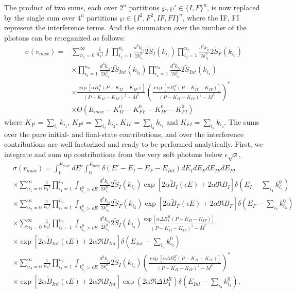 The product of two sums, each over $2^n$ partitions $\wp,\wp'\in\{I,F\}^n$, is now replaced by the single sum over $4^n$ partitions $\wp\in\{I^2,F^2,IF,FI\}^n$, where the IF, FI represent the interference terms. And the summation over the number of the photons can be reorganized as follows:
\begin{align}
\sigma(v_{max})
=&\sum_{n_1=0}^{\infty}\frac{1}{n_1!}\int\prod_{i_1=1}^{n_1}\frac{d^3k_{i_1}}{2k^0_{i_1}}2\widetilde{S}_I(k_{i_1})\prod_{i_2=1}^{n_2}\frac{d^3k_{i_2}}{2k^0_{i_2}}2\widetilde{S}_F(k_{i_2})\nonumber\\
&\times\prod_{i_3=1}^{n_3}\frac{d^3k_{i_3}}{2k^0_{i_3}}2\widetilde{S}_{Int}(k_{i_3})\prod_{i_4=1}^{n_4}\frac{d^3k_{i_4}}{2k^0_{i_4}}2\widetilde{S}_{Int}(k_{i_4})\nonumber\\
&\times\frac{\exp[\alpha B^R_4(P-K_{II}-K_{IF})]}{(P-K_{II}-K_{IF})^2-\bar{M}^2}\left(\frac{\exp[\alpha B^R_4(P-K_{II}-K_{IF})]}{(P-K_{II}-K_{IF})^2-\bar{M}^2}\right)^\ast\nonumber\\
&\times\Theta(E_{max}-K^0_{II}-K^0_{FF}-K^0_{IF}-K^0_{FI})
\end{align}
where $K_{I^2}=\sum_{i_1}k_{i_1}$, $K_{F^2}=\sum_{i_2}k_{i_2}$, $K_{IF}=\sum_{i_3}k_{i_3}$ and $K_{FI}=\sum_{i_4}k_{i_4}$. The sums over the pure initial- and final-state contributions, and over the interference contributions are well factorized and ready to be performed analytically. First, we integrate and sum up contributions from the very soft photons below $\epsilon\sqrt{s}$,
\begin{align}
&\sigma(v_{max})=\int_{0}^{E_{max}}dE'\int_{0}^{E_{max}}\delta(E'-E_I-E_F-E_{Int})dE_IdE_FdE_{IF}dE_{FI}\nonumber\\
&\times\sum_{n_1=0}^{\infty}\frac{1}{n_1!}\prod_{i_1=1}^{n_1}\int_{k^0_{i_1}>\epsilon E}\frac{d^3k_{i_1}}{2k^0_{i_1}}2\widetilde{S}_I(k_{i_1})\exp[2\alpha\widetilde{B}_I(\epsilon E)+2\alpha\Re B_I]\delta\left(E_I-\sum_{i_1}k^0_{i_1}\right)\nonumber\\
&\times\sum_{n_2=0}^{\infty}\frac{1}{n_2!}\prod_{i_2=1}^{n_2}\int_{k^0_{i_2}>\epsilon E}\frac{d^3k_{i_2}}{2k^0_{i_2}}2\widetilde{S}_F(k_{i_2})\exp[2\alpha\widetilde{B}_F(\epsilon E)+2\alpha\Re B_F]\delta\left(E_F-\sum_{i_2}k^0_{i_2}\right)\nonumber\\
&\times\sum_{n_3=0}^{\infty}\frac{1}{n_3!}\prod_{i_3=1}^{n_3}\int_{k^0_{i_3}>\epsilon E}\frac{d^3k_{i_3}}{2k^0_{i_3}}2\widetilde{S}_I(k_{i_3})\frac{\exp[\alpha\Delta B^R_4(P-K_{II}-K_{IF})]}{(P-K_{II}-K_{IF})^2-\bar{M}^2}\nonumber\\
&\times\exp[2\alpha\widetilde{B}_{Int}(\epsilon E)+2\alpha\Re B_{Int}]\delta\left(E_{Int}-\sum_{i_3}k^0_{i_3}\right)\nonumber\\
&\times\sum_{n_4=0}^{\infty}\frac{1}{n_4!}\prod_{i_4=1}^{n_4}\int_{k^0_{i_4}>\epsilon E}\frac{d^3k_{i_4}}{2k^0_{i_4}}2\widetilde{S}_I(k_{i_4})\left(\frac{\exp[\alpha\Delta B^R_4(P-K_{II}-K_{IF})]}{(P-K_{II}-K_{IF})^2-\bar{M}^2}\right)^\ast\nonumber\\
&\times\exp[2\alpha\widetilde{B}_{Int}(\epsilon E)+2\alpha\Re B_{Int}]\exp(2\alpha\Re\Delta B^R_4)\delta\left(E_{Int}-\sum_{i_3}k^0_{i_3}\right),
\end{align}
